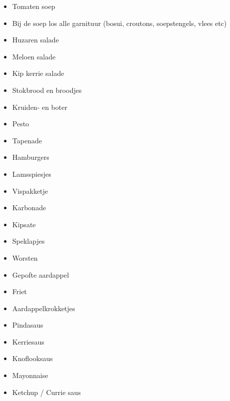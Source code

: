 \begin{itemize}
	\item	Tomaten soep  
	\item	Bij de soep los alle garnituur (bosui, croutons, soepstengels, vlees etc)
	\item	Huzaren salade
	\item	Meloen salade
	\item	Kip kerrie salade
	\item	Stokbrood en broodjes
	\item	Kruiden- en boter
	\item	Pesto
	\item	Tapenade
	\item	Hamburgers
	\item	Lamsspiesjes
	\item	Vispakketje
	\item	Karbonade
	\item	Kipsate
	\item	Speklapjes
	\item	Worsten
	\item	Gepofte aardappel
	\item	Friet
	\item	Aardappelkrokketjes
	\item	Pindasaus
	\item	Kerriesaus
	\item	Knoflooksaus
	\item	Mayonnaise
	\item	Ketchup / Currie saus
\end{itemize}
